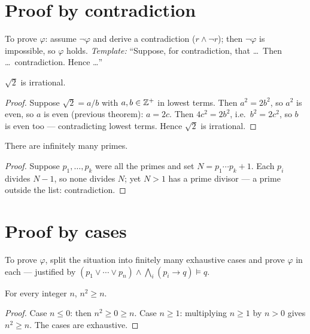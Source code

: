 \section{Proof by contradiction}

To prove $\varphi$: assume $\neg\varphi$ and derive a contradiction
($r \wedge \neg r$); then $\neg\varphi$ is impossible, so $\varphi$ holds.
\emph{Template:} ``Suppose, for contradiction, that \ldots\ Then \ldots\
contradiction. Hence \ldots''

\begin{theorem}\label{thm:sqrt2}
$\sqrt{2}$ is irrational.
\end{theorem}

\begin{proof}
Suppose $\sqrt2 = a/b$ with $a, b \in \mathbb{Z}^{+}$ in lowest terms. Then
$a^{2} = 2b^{2}$, so $a^{2}$ is even, so $a$ is even (previous theorem):
$a = 2c$. Then $4c^{2} = 2b^{2}$, i.e.\ $b^{2} = 2c^{2}$, so $b$ is even
too --- contradicting lowest terms. Hence $\sqrt2$ is irrational.
\end{proof}

\begin{theorem}[Euclid]\label{thm:euclid}
There are infinitely many primes.
\end{theorem}

\begin{proof}
Suppose $p_1, \ldots, p_k$ were all the primes and set
$N = p_1 \cdots p_k + 1$. Each $p_i$ divides $N - 1$, so none divides $N$;
yet $N > 1$ has a prime divisor --- a prime outside the list:
contradiction.
\end{proof}

\section{Proof by cases}

To prove $\varphi$, split the situation into finitely many exhaustive cases
and prove $\varphi$ in each --- justified by
$(p_1 \vee \cdots \vee p_n) \wedge \bigwedge_i (p_i \to q) \models q$.

\begin{theorem}
For every integer $n$, $n^{2} \geq n$.
\end{theorem}

\begin{proof}
Case $n \leq 0$: then $n^2 \geq 0 \geq n$. Case $n \geq 1$: multiplying
$n \geq 1$ by $n > 0$ gives $n^{2} \geq n$. The cases are exhaustive.
\end{proof}

